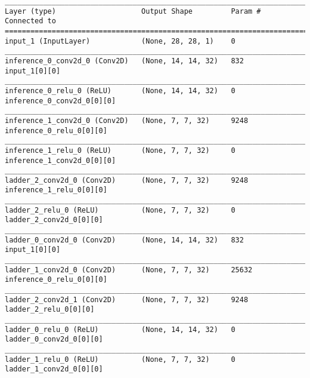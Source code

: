 \begin{lstlisting}[caption={\ac{VLAE} network encoder used for network sparsity experiments with half the number of feature maps},captionpos=b,basicstyle=\tiny, label={lst:sparsity-vlae-encoder-28-fm2}]
__________________________________________________________________________________________________
Layer (type)                    Output Shape         Param #     Connected to
==================================================================================================
input_1 (InputLayer)            (None, 28, 28, 1)    0
__________________________________________________________________________________________________
inference_0_conv2d_0 (Conv2D)   (None, 14, 14, 32)   832         input_1[0][0]
__________________________________________________________________________________________________
inference_0_relu_0 (ReLU)       (None, 14, 14, 32)   0           inference_0_conv2d_0[0][0]
__________________________________________________________________________________________________
inference_1_conv2d_0 (Conv2D)   (None, 7, 7, 32)     9248        inference_0_relu_0[0][0]
__________________________________________________________________________________________________
inference_1_relu_0 (ReLU)       (None, 7, 7, 32)     0           inference_1_conv2d_0[0][0]
__________________________________________________________________________________________________
ladder_2_conv2d_0 (Conv2D)      (None, 7, 7, 32)     9248        inference_1_relu_0[0][0]
__________________________________________________________________________________________________
ladder_2_relu_0 (ReLU)          (None, 7, 7, 32)     0           ladder_2_conv2d_0[0][0]
__________________________________________________________________________________________________
ladder_0_conv2d_0 (Conv2D)      (None, 14, 14, 32)   832         input_1[0][0]
__________________________________________________________________________________________________
ladder_1_conv2d_0 (Conv2D)      (None, 7, 7, 32)     25632       inference_0_relu_0[0][0]
__________________________________________________________________________________________________
ladder_2_conv2d_1 (Conv2D)      (None, 7, 7, 32)     9248        ladder_2_relu_0[0][0]
__________________________________________________________________________________________________
ladder_0_relu_0 (ReLU)          (None, 14, 14, 32)   0           ladder_0_conv2d_0[0][0]
__________________________________________________________________________________________________
ladder_1_relu_0 (ReLU)          (None, 7, 7, 32)     0           ladder_1_conv2d_0[0][0]

\end{lstlisting}
